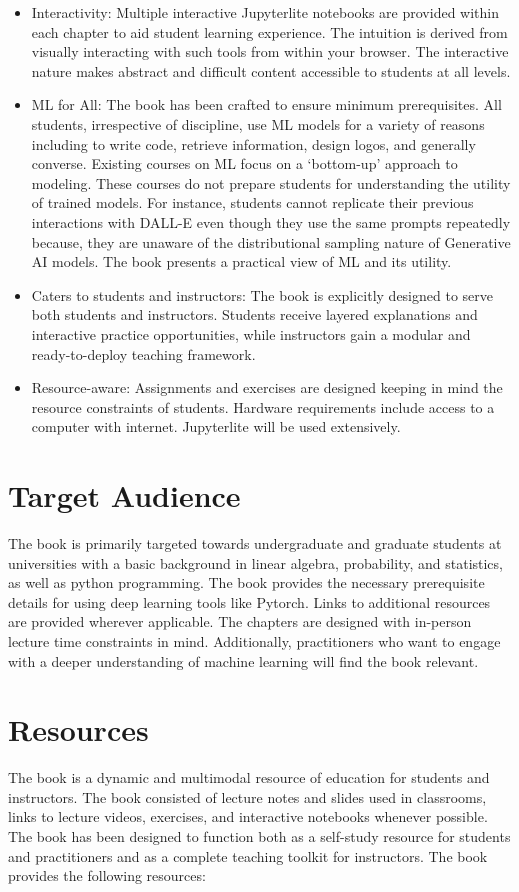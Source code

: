 \documentclass{article}
\begin{document}
\begin{itemize}
    \item Interactivity: Multiple interactive Jupyterlite notebooks are provided within each chapter to aid student learning experience. The intuition is derived from visually interacting with such tools from within your browser. The interactive nature makes abstract and difficult content accessible to students at all levels.
    \item ML for All: The book has been crafted to ensure minimum prerequisites. All students, irrespective of discipline, use ML models for a variety of reasons including to write code, retrieve information, design logos, and generally converse. Existing courses on ML focus on a `bottom-up' approach to modeling. These courses do not prepare students for understanding the utility of trained models. For instance, students cannot replicate their previous interactions with DALL-E even though they use the same prompts repeatedly because, they are unaware of the distributional sampling nature of Generative AI models. The book presents a practical view of ML and its utility.
    \item Caters to students and instructors: The book is explicitly designed to serve both students and instructors. Students receive layered explanations and interactive practice opportunities, while instructors gain a modular and ready-to-deploy teaching framework.
    \item Resource-aware: Assignments and exercises are designed keeping in mind the resource constraints of students. Hardware requirements include access to a computer with internet. Jupyterlite will be used extensively. 
\end{itemize}


\section{Target Audience}
The book is primarily targeted towards undergraduate and graduate students at universities with a basic background in linear algebra, probability, and statistics, as well as python programming. The book provides the necessary prerequisite details for using deep learning tools like Pytorch. Links to additional resources are provided wherever applicable. The chapters are designed with in-person lecture time constraints in mind. Additionally, practitioners who want to engage with a deeper understanding of machine learning will find the book relevant.

\section{Resources}
The book is a dynamic and multimodal resource of education for students and instructors. The book consisted of lecture notes and slides used in classrooms, links to lecture videos, exercises, and interactive notebooks whenever possible. The book has been designed to function both as a self-study resource for students and practitioners and as a complete teaching toolkit for instructors. The book provides the following resources:
\end{document}
